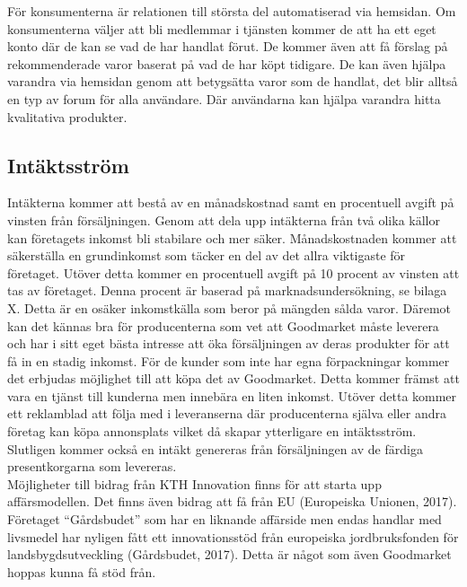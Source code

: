 \documentclass[10pt,a4paper,oneside]{article}
\begin{document}
För konsumenterna är relationen till största del automatiserad via hemsidan. Om konsumenterna väljer att bli medlemmar i tjänsten kommer de att ha ett eget konto där de kan se vad de har handlat förut. De kommer även att få förslag på rekommenderade varor baserat på vad de har köpt tidigare. De kan även hjälpa varandra via hemsidan genom att betygsätta varor som de handlat, det blir alltså en typ av forum för alla användare. Där användarna kan hjälpa varandra hitta kvalitativa produkter. 


\subsection{Intäktsström}
Intäkterna kommer att bestå av en månadskostnad samt en procentuell avgift på vinsten från försäljningen. Genom att dela upp intäkterna från två olika källor kan företagets inkomst bli stabilare och mer säker. Månadskostnaden kommer att säkerställa en grundinkomst som täcker en del av det allra viktigaste för företaget. Utöver detta kommer en procentuell avgift på 10 procent av vinsten att tas av företaget. Denna procent är baserad på marknadsundersökning, se bilaga X. Detta är en osäker inkomstkälla som beror på mängden sålda varor. Däremot kan det kännas bra för producenterna som vet att Goodmarket måste leverera och har i sitt eget bästa intresse att öka försäljningen av deras produkter för att få in en stadig inkomst. För de kunder som inte har egna förpackningar kommer det erbjudas möjlighet till att köpa det av Goodmarket. Detta kommer främst att vara en tjänst till kunderna men innebära en liten inkomst. Utöver detta kommer ett reklamblad att följa med i leveranserna där producenterna själva eller andra företag kan köpa annonsplats vilket då skapar ytterligare en intäktsström. Slutligen kommer också en intäkt genereras från försäljningen av de färdiga presentkorgarna som levereras. \\

Möjligheter till bidrag från KTH Innovation finns för att starta upp affärsmodellen. Det finns även bidrag att få från EU (Europeiska Unionen, 2017). Företaget “Gårdsbudet” som har en liknande affärside men endas handlar med livsmedel har nyligen fått ett innovationsstöd från europeiska jordbruksfonden för landsbygdsutveckling (Gårdsbudet, 2017). Detta är något som även Goodmarket hoppas kunna få stöd från.  
\end{document}
